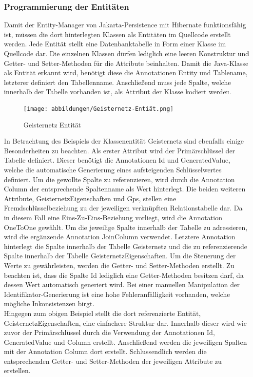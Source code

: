 \documentclass[11pt]{article}
\begin{document}
    \subsubsection{Programmierung der Entitäten}
    Damit der Entity-Manager von Jakarta-Persistence mit Hibernate funktionsfähig ist, müssen die dort hinterlegten Klassen als Entitäten im Quellcode erstellt werden. Jede Entität 
    stellt eine Datenbanktabelle in Form einer Klasse im Quellcode dar.
    Die einzelnen Klassen dürfen lediglich eine leeren Konstruktur und Getter- und Setter-Methoden für die Attribute beinhalten.
    Damit die Java-Klasse als Entität erkannt wird, benötigt diese die Annotationen Entity und Tablename, letzterer definiert den Tabellenname. 
    Anschließend muss jede Spalte, welche innerhalb der Tabelle vorhanden ist, als Attribut der Klasse kodiert werden.
    \begin{figure}[H]
        \centering
        \texttt{[image: abbildungen/Geisternetz-Entiät.png]}
        \caption{Geisternetz Entität}
        \label{geisternetz-entitaet}
    \end{figure} 
    In Betrachtung des Beispiels der Klassenentität Geisternetz sind ebenfalls einige Besonderheiten zu beachten. Als erster Attribut
    wird der Primärschlüssel der Tabelle definiert. Dieser benötigt die Annotationen Id und GeneratedValue, welche
    die automatische Generierung eines aufsteigenden Schlüsselwertes definiert. Um die gewollte Spalte zu referenzieren, wird
    durch die Annotation Column der entsprechende Spaltenname als Wert hinterlegt.
    Die beiden weiteren Attribute, GeisternetzEigenschaften und Gps, stellen eine Fremdschlüsselbeziehung zu der jeweiligen verknüpften Relationstabelle dar.
    Da in diesem Fall eine Eins-Zu-Eins-Beziehung vorliegt, wird die Annotation OneToOne gewählt. Um die jeweilige Spalte innerhalb der Tabelle zu
    adressieren, wird die ergänzende Annotation JoinColumn verwendet. Letztere Annotation hinterlegt die Spalte innerhalb der Tabelle Geisternetz und die zu referenzierende Spalte
    innerhalb der Tabelle GeisternetzEigenschaften.
    Um die Steuerung der Werte zu gewährleisten, werden die Getter- und Setter-Methoden erstellt. Zu beachten ist, dass die Spalte Id
    lediglich eine Getter-Methoden besitzen darf, da dessen Wert automatisch generiert wird. Bei einer manuellen Manipulation der
    Identifikator-Generierung ist eine hohe Fehleranfälligkeit vorhanden, welche mögliche Inkonsistenzen birgt.
    \\
    Hingegen zum obigen Beispiel stellt die dort referenzierte Entität, GeisternetzEigenschaften, eine einfachere Struktur dar.
    Innerhalb dieser wird wie zuvor der Primärschlüssel durch die Verwendung der Annotationen Id, GeneratedValue und
    Column erstellt. Anschließend werden die jeweiligen Spalten mit der Annotation Column dort erstellt.
    Schlussendlich werden die entsprechenden Getter- und Setter-Methoden der jeweiligen Attribute zu erstellen.
\end{document}
